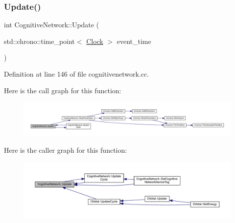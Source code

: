 \mbox{\label{class_cognitive_network_a05dccc7759456df13a732899a8f1f4c4}} 
\subsubsection{\texorpdfstring{Update()}{Update()}}
{\footnotesize\ttfamily int Cognitive\+Network\+::\+Update (\begin{DoxyParamCaption}\item[{std\+::chrono\+::time\+\_\+point$<$ \hyperlink{universe_8h_a0ef8d951d1ca5ab3cfaf7ab4c7a6fd80}{Clock} $>$}]{event\+\_\+time }\end{DoxyParamCaption})}



Definition at line 146 of file cognitivenetwork.\+cc.

Here is the call graph for this function\+:
\nopagebreak
\begin{figure}[H]
\begin{center}
\leavevmode
\includegraphics[width=350pt]{class_cognitive_network_a05dccc7759456df13a732899a8f1f4c4_cgraph}
\end{center}
\end{figure}
Here is the caller graph for this function\+:
\nopagebreak
\begin{figure}[H]
\begin{center}
\leavevmode
\includegraphics[width=350pt]{class_cognitive_network_a05dccc7759456df13a732899a8f1f4c4_icgraph}
\end{center}
\end{figure}
\mbox{\label{class_cognitive_network_aa37dda869174e4eef986cca4ce3e55d2}} 
